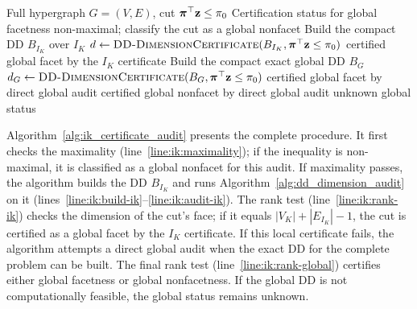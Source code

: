 \begin{algorithm}[t]
\caption{\textsc{GlobalFacetAuditViaIK}}
\label{alg:ik_certificate_audit}
\begin{algorithmic}[1]
\Require Full hypergraph $G=(V,E)$, cut $\bm{\pi}^\top \mathbf{z}\le \pi_0$
\Ensure Certification status for global facetness
\label{line:ik:maximality}
    \State \Return non-maximal; classify the cut as a global nonfacet
\EndIf
\State Build the compact DD $B_{I_K}$ over $I_K$\label{line:ik:build-ik}
\State $d \gets \textsc{DD-DimensionCertificate}(B_{I_K},\bm{\pi}^\top \mathbf{z}\le \pi_0)$\label{line:ik:audit-ik}
\label{line:ik:rank-ik}
    \State \Return certified global facet by the $I_K$ certificate
\EndIf
{}\label{line:ik:global-feasible}
    \State Build the compact exact global DD $B_{G}$\label{line:ik:build-global}
    \State $d_G \gets \textsc{DD-DimensionCertificate}(B_G,\bm{\pi}^\top \mathbf{z}\le \pi_0)$\label{line:ik:audit-global}
    \label{line:ik:rank-global}
        \State \Return certified global facet by direct global audit
    \Else
        \State \Return certified global nonfacet by direct global audit
    \EndIf
\EndIf
\State \Return unknown global status
\end{algorithmic}
\end{algorithm}

Algorithm~\ref{alg:ik_certificate_audit} presents the complete procedure. It first checks the maximality (line~\ref{line:ik:maximality}); if the inequality is non-maximal, it is classified as a global nonfacet for this audit. If maximality passes, the algorithm builds the DD $B_{I_K}$ and runs Algorithm~\ref{alg:dd_dimension_audit} on it (lines~\ref{line:ik:build-ik}--\ref{line:ik:audit-ik}). The rank test (line~\ref{line:ik:rank-ik}) checks the dimension of the cut's face; if it equals $|V_K|+|E_{I_K}|-1$, the cut is certified as a global facet by the $I_K$ certificate. If this local certificate fails, the algorithm attempts a direct global audit when the exact DD for the complete problem can be built. The final rank test (line~\ref{line:ik:rank-global})  certifies either global facetness or global nonfacetness. If the global DD is not computationally feasible, the global status remains unknown.